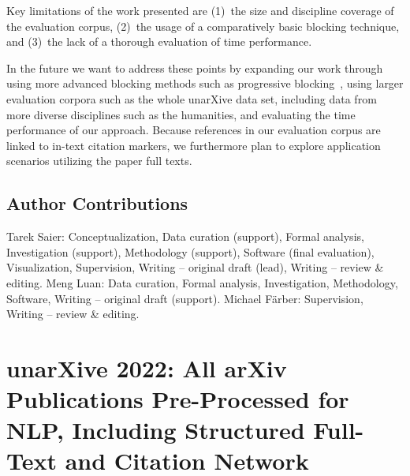 Key limitations of the work presented are (1)~the size and discipline coverage of the evaluation corpus, (2)~the usage of a comparatively basic blocking technique, and (3)~the lack of a thorough evaluation of time performance.

In the future we want to address these points by expanding our work through using more advanced blocking methods such as progressive blocking~\cite{Simonini2019,Galhotra2021}, using larger evaluation corpora such as the whole unarXive data set, including data from more diverse disciplines such as the humanities, and evaluating the time performance of our approach.
Because references in our evaluation corpus are linked to in-text citation markers, we furthermore plan to explore application scenarios utilizing the paper full texts. %


\subsection*{Author Contributions}  %
Tarek Saier: Conceptualization, Data curation (support), Formal analysis, Investigation (support), Methodology (support), Software (final evaluation), Visualization, Supervision, Writing -- original draft (lead), Writing -- review \& editing. Meng Luan: Data curation, Formal analysis, Investigation, Methodology, Software, Writing -- original draft (support). Michael F{\"a}rber: Supervision, Writing -- review \& editing.


\section{unarXive 2022: All arXiv Publications Pre-Processed for NLP, Including Structured Full-Text and Citation Network}

